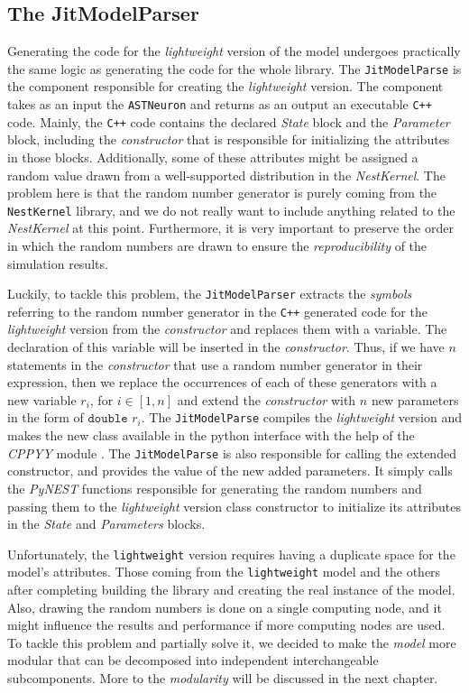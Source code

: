 \subsection{The JitModelParser}

Generating the code for the \emph{lightweight} version of the model undergoes practically the same logic as generating the code for the whole library.  The \texttt{JitModelParse} is the component responsible for creating the \emph{lightweight} version. The component takes as an input the \texttt{ASTNeuron} and returns as an output an executable \texttt{C++} code. Mainly, the \texttt{C++} code contains the declared \emph{State} block and the \emph{Parameter} block, including the \emph{constructor} that is responsible for initializing the attributes in those blocks. Additionally, some of these attributes might  be assigned a random value drawn from a well-supported distribution in the \emph{NestKernel}. The problem here is that the random number generator is purely coming from the \texttt{NestKernel} library, and we do not really want to include anything related to the \emph{NestKernel} at this point. Furthermore, it is very important to preserve the order in which the random numbers are drawn to ensure the \emph{reproducibility} of the simulation results.

Luckily, to tackle this problem, the \texttt{JitModelParser} extracts the \emph{symbols} referring to the random number generator in the \texttt{C++} generated code for the \emph{lightweight} version from the \emph{constructor} and replaces them with a variable. The declaration of this variable will be inserted in the \emph{constructor}. Thus, if we have $n$ statements in the \emph{constructor} that use a random number generator in their expression, then we replace the occurrences of each of these generators with a new variable $r_i$, for $i \in [1, n]$ and extend the \emph{constructor} with $n$ new parameters in the form of $\texttt{double } r_i$. The \texttt{JitModelParse} compiles the \emph{lightweight} version and makes the new class available in the python interface with the help of the \emph{CPPYY} module \cite{cppyy}. The \texttt{JitModelParse} is also responsible for calling the extended constructor, and provides the value of the new added parameters. It simply calls the \emph{PyNEST} functions responsible for generating the random numbers and passing them to the \emph{lightweight} version class constructor to initialize its attributes in the \emph{State} and \emph{Parameters} blocks.

Unfortunately, the \texttt{lightweight} version requires having a duplicate space for the model's attributes. Those coming from the \texttt{lightweight} model  and the others after completing building the library and creating the real instance of the model. Also, drawing the random numbers is done on a single computing node, and it might influence the results and performance if more computing nodes are used. To tackle this problem and partially solve it, we decided to make the \emph{model} more modular that can be decomposed into independent interchangeable subcomponents. More to the \emph{modularity} will be discussed in the next chapter.

